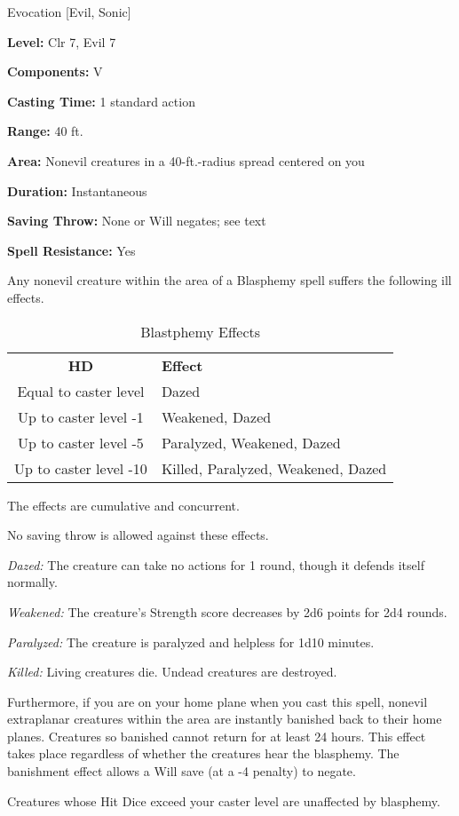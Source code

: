 
Evocation [Evil, Sonic]

\textbf{Level:} Clr 7, Evil 7

\textbf{Components:} V

\textbf{Casting Time:} 1 standard action

\textbf{Range:} 40 ft.

\textbf{Area:} Nonevil creatures in a 40-ft.-radius spread centered on you

\textbf{Duration:} Instantaneous

\textbf{Saving Throw:} None or Will negates; see text

\textbf{Spell Resistance:} Yes

Any nonevil creature within the area of a Blasphemy spell suffers the 
following ill effects.

\begin{table}[htb]
\caption{Blastphemy Effects}
\centering
\begin{tabular}{c l}
\textbf{HD} & \textbf{Effect} \\
Equal to caster level & Dazed\\
Up to caster level -1 & Weakened, Dazed\\
Up to caster level -5 & Paralyzed, Weakened, Dazed\\
Up to caster level -10 & Killed, Paralyzed, Weakened, Dazed\\
\end{tabular}
\end{table}

The effects are cumulative and concurrent.

No saving throw is allowed against these effects.

\textit{Dazed:} The creature can take no actions for 1 round, though it defends itself normally.

\textit{Weakened:} The creature's Strength score decreases by 2d6 points for 2d4 rounds.

\textit{Paralyzed:} The creature is paralyzed and helpless for 1d10 minutes.

\textit{Killed:} Living creatures die. Undead creatures are destroyed.

Furthermore, if you are on your home plane when you cast this spell, nonevil extraplanar 
creatures within the area are instantly banished back to their home planes. Creatures 
so banished cannot return for at least 24 hours. This effect takes place regardless 
of whether the creatures hear the blasphemy. The banishment effect allows 
a Will save (at a -4 penalty) to negate.

Creatures whose Hit Dice exceed your caster level are unaffected by blasphemy.

